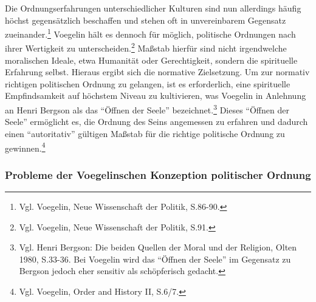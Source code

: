 Die Ordnungserfahrungen unterschiedlicher Kulturen sind nun allerdings häufig
höchst gegensätzlich beschaffen und stehen oft in unvereinbarem Gegensatz
zueinander.\footnote{Vgl. Voegelin, Neue Wissenschaft der Politik, S.86-90.}
Voegelin hält es dennoch für möglich, politische Ordnungen nach ihrer
Wertigkeit zu unterscheiden.\footnote{Vgl.  Voegelin, Neue Wissenschaft der
  Politik, S.91.} Maßstab hierfür sind nicht irgendwelche moralischen Ideale,
etwa Humanität oder Gerechtigkeit, sondern die spirituelle Erfahrung selbst.
Hieraus ergibt sich die normative Zielsetzung. Um zur normativ richtigen
politischen Ordnung zu gelangen, ist es erforderlich, eine spirituelle
Empfindsamkeit auf höchstem Niveau zu kultivieren, was Voegelin in Anlehnung
an Henri Bergson als das "`Öffnen der Seele"' bezeichnet.\footnote{Vgl. Henri
  Bergson: Die beiden Quellen der Moral und der Religion, Olten 1980, S.33-36.
  Bei Voegelin wird das "`Öffnen der Seele"' im Gegensatz zu Bergson jedoch
  eher sensitiv als schöpferisch gedacht.} Dieses "`Öffnen der Seele"'
ermöglicht es, die Ordnung des Seins angemessen zu erfahren und dadurch einen
"`autoritativ"' gültigen Maßstab für die richtige politische Ordnung zu
gewinnen.\footnote{Vgl. Voegelin, Order and History II, S.6/7.}

\subsubsection{Probleme der Voegelinschen Konzeption politischer Ordnung}

